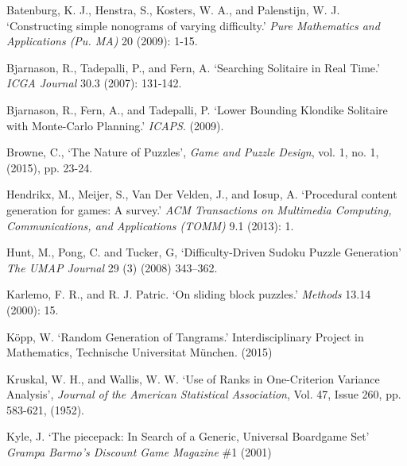 \documentclass[10pt,journal,compsoc]{IEEEtran}
\begin{document}
%
%
%
\begin{thebibliography}{4}

 Batenburg, K. J., Henstra, S., Kosters, W. A., and  Palenstijn, W. J. `Constructing simple nonograms of varying difficulty.' {\it Pure Mathematics and Applications (Pu. MA)} 20 (2009): 1-15.

 Bjarnason, R., Tadepalli, P., and Fern, A. `Searching Solitaire in Real Time.' {\it ICGA Journal} 30.3 (2007): 131-142.

 Bjarnason, R., Fern, A., and Tadepalli, P. `Lower Bounding Klondike Solitaire with Monte-Carlo Planning.' {\it ICAPS}. (2009).

 Browne, C., `The Nature of Puzzles', {\it Game and Puzzle Design}, vol. 1, no. 1, (2015), pp. 23-24.

 Hendrikx, M., Meijer, S., Van Der Velden, J., and Iosup, A. `Procedural content generation for games: A survey.' {\it ACM Transactions on Multimedia Computing, Communications, and Applications (TOMM)} 9.1 (2013): 1.

 Hunt, M.,  Pong, C. and Tucker, G, `Difficulty-Driven Sudoku Puzzle Generation' {\it The UMAP Journal} 29 (3) (2008) 343–362.

 Karlemo, F. R., and R. J. Patric. `On sliding block puzzles.' {\it Methods} 13.14 (2000): 15.

 K{\"o}pp, W. `Random Generation of Tangrams.' Interdisciplinary Project in Mathematics, Technische Universitat M{\"u}nchen. (2015)

 Kruskal, W. H.,  and Wallis, W. W. `Use of Ranks in One-Criterion Variance Analysis', {\it Journal of the American Statistical Association}, Vol. 47, Issue 260, pp. 583-621, (1952).

 Kyle, J. `The piecepack: In Search of a Generic, Universal Boardgame Set' {\it Grampa Barmo's Discount Game Magazine} \#1 (2001)


\end{thebibliography}
\end{document}
